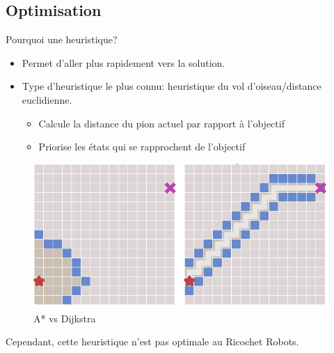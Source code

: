 \documentclass{beamer}
\begin{document}
    \subsection{Optimisation}
        \begin{frame}{Pourquoi une heuristique?}
            \begin{itemize}
                \item Permet d'aller plus rapidement vers la solution.
                \item  Type d'heuristique le plus connu: heuristique du vol d'oiseau/distance euclidienne.
                
                \begin{itemize}
                    \item Calcule la distance du pion actuel par rapport à l'objectif
                    \item Priorise les états qui se rapprochent de l'objectif
                \end{itemize}
            \end{itemize}
            \begin{figure}
                \centering
                \includegraphics[scale=0.35]{Images/2.PNG}
                \caption{A* vs Dijkstra}
            \end{figure}
            Cependant, cette heuristique n'est pas optimale au Ricochet Robots.
        \end{frame}
        
\end{document}
